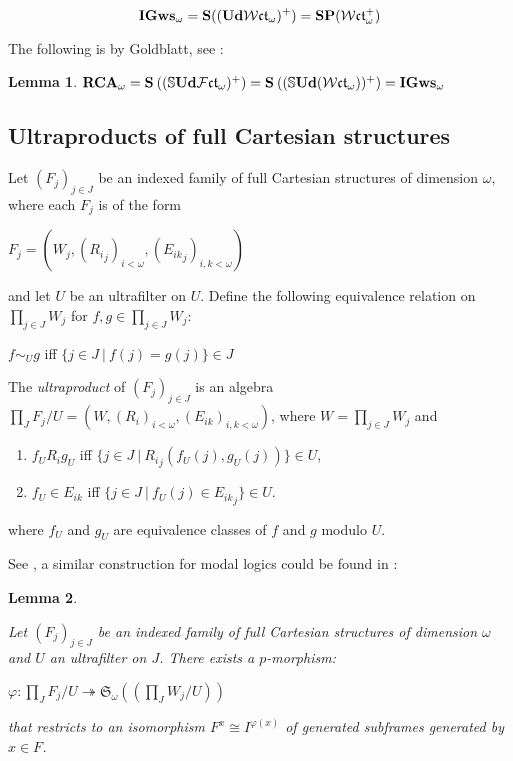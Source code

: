 \documentclass{article}
\theoremstyle{defin}
\theoremstyle{theorem}
\theoremstyle{claim}
\theoremstyle{prop}
\theoremstyle{lemma}
\newtheorem{lemma}{Lemma}
\theoremstyle{fact}
\theoremstyle{remark}
\theoremstyle{ex}
\theoremstyle{col}
\theoremstyle{question}
\begin{document}
\begin{equation}
{\bf IGws}_{\omega} = {\bf S} (({\bf Ud} \mathcal{W}\mathfrak{ct}_{\omega})^+) = {\bf S P} (\mathcal{W}\mathfrak{ct}_{\omega}^{+})
\end{equation}

The following is by Goldblatt, see \cite[Lemma 3.4]{goldblatt1995elementary}:
\begin{lemma}
${\bf RCA}_{\omega} = {\bf S} \: ((\mathbb{S} {\bf Ud} \mathcal{F}\mathfrak{ct}_{\omega})^{+}) = {\bf S} \: ((\mathbb{S} {\bf Ud} (\mathcal{W}\mathfrak{ct}_{\omega}))^{+}) = {\bf IGws}_{\omega}$
\end{lemma}

\subsection{Ultraproducts of full Cartesian structures}

Let $(F_j)_{j \in J}$ be an indexed family of full Cartesian structures of dimension $\omega$, where each $F_j$ is of the form 
\begin{center}
$F_j = (W_j, ({R_i}_j)_{i < \omega}, ({E_{ik}}_j)_{i, k < \omega})$
\end{center}
and let $U$ be an ultrafilter on $U$. Define the following equivalence relation on $\prod \limits_{j \in J} W_j$ for $f, g \in \prod \limits_{j \in J} W_j$:
\begin{center}
$f \sim_{U} g$ iff $\{ j \in J \: | \: f(j) = g(j) \} \in J$
\end{center}
The \emph{ultraproduct} of $(F_j)_{j \in J}$ is an algebra $\prod \limits_{J} F_j / U = (W, (R_i)_{i < \omega}, (E_{ik})_{i, k < \omega})$, where $W = \prod \limits_{j \in J} W_j$ and
\begin{enumerate}
\item $f_U R_i g_U$ iff $\{ j \in J \: | \: {R_i}_j(f_U(j), g_U(j)) \} \in U$,
\item $f_U \in E_{ik}$ iff $\{ j \in J \: | \: f_U(j) \in {E_{ik}}_j \} \in U$.
\end{enumerate}
where $f_U$ and $g_U$ are equivalence classes of $f$ and $g$ modulo $U$.

See \cite[Lemma 3.5]{goldblatt1995elementary}, a similar construction for modal logics could be found in \cite{fine1975some}:
\begin{lemma} \label{ultrapmor}

Let $(F_j)_{j \in J}$ be an indexed family of full Cartesian structures of dimension $\omega$ and $U$ an ultrafilter on $J$. There exists a $p$-morphism:

\begin{center}
$\varphi : \prod \limits_{J} F_j / U \twoheadrightarrow \mathfrak{S}_{\omega}((\prod \limits_{J} W_j / U))$
\end{center}
that restricts to an isomorphism $F^x \cong I^{\varphi(x)}$ of generated subframes generated by $x \in F$.
\end{lemma}
\end{document}
